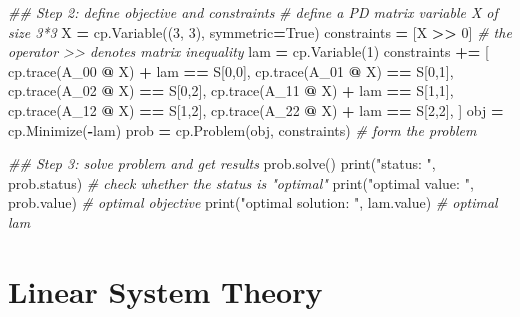 \documentclass[
]{book}
\newenvironment{Shaded}{\begin{snugshade}}{\end{snugshade}}
\newcommand{\BuiltInTok}[1]{#1}
\newcommand{\CommentTok}[1]{\textcolor[rgb]{0.56,0.35,0.01}{\textit{#1}}}
\newcommand{\DecValTok}[1]{\textcolor[rgb]{0.00,0.00,0.81}{#1}}
\newcommand{\NormalTok}[1]{#1}
\newcommand{\OperatorTok}[1]{\textcolor[rgb]{0.81,0.36,0.00}{\textbf{#1}}}
\newcommand{\StringTok}[1]{\textcolor[rgb]{0.31,0.60,0.02}{#1}}
\newcommand{\VariableTok}[1]{\textcolor[rgb]{0.00,0.00,0.00}{#1}}
\theoremstyle{definition}
\theoremstyle{definition}
\theoremstyle{definition}
\theoremstyle{definition}
\theoremstyle{remark}
\begin{document}
\begin{Shaded}
\begin{Highlighting}[]
\CommentTok{\#\# Step 2: define objective and constraints}
\CommentTok{\# define a PD matrix variable X of size 3*3}
\NormalTok{X }\OperatorTok{=}\NormalTok{ cp.Variable((}\DecValTok{3}\NormalTok{, }\DecValTok{3}\NormalTok{), symmetric}\OperatorTok{=}\VariableTok{True}\NormalTok{)}
\NormalTok{constraints }\OperatorTok{=}\NormalTok{ [X }\OperatorTok{\textgreater{}\textgreater{}} \DecValTok{0}\NormalTok{] }\CommentTok{\# the operator \textgreater{}\textgreater{} denotes matrix inequality}
\NormalTok{lam }\OperatorTok{=}\NormalTok{ cp.Variable(}\DecValTok{1}\NormalTok{)}
\NormalTok{constraints }\OperatorTok{+=}\NormalTok{ [}
\NormalTok{    cp.trace(A\_00 }\OperatorTok{@}\NormalTok{ X) }\OperatorTok{+}\NormalTok{ lam }\OperatorTok{==}\NormalTok{ S[}\DecValTok{0}\NormalTok{,}\DecValTok{0}\NormalTok{],}
\NormalTok{    cp.trace(A\_01 }\OperatorTok{@}\NormalTok{ X) }\OperatorTok{==}\NormalTok{ S[}\DecValTok{0}\NormalTok{,}\DecValTok{1}\NormalTok{],}
\NormalTok{    cp.trace(A\_02 }\OperatorTok{@}\NormalTok{ X) }\OperatorTok{==}\NormalTok{ S[}\DecValTok{0}\NormalTok{,}\DecValTok{2}\NormalTok{],}
\NormalTok{    cp.trace(A\_11 }\OperatorTok{@}\NormalTok{ X) }\OperatorTok{+}\NormalTok{ lam }\OperatorTok{==}\NormalTok{ S[}\DecValTok{1}\NormalTok{,}\DecValTok{1}\NormalTok{],}
\NormalTok{    cp.trace(A\_12 }\OperatorTok{@}\NormalTok{ X) }\OperatorTok{==}\NormalTok{ S[}\DecValTok{1}\NormalTok{,}\DecValTok{2}\NormalTok{],}
\NormalTok{    cp.trace(A\_22 }\OperatorTok{@}\NormalTok{ X) }\OperatorTok{+}\NormalTok{ lam }\OperatorTok{==}\NormalTok{ S[}\DecValTok{2}\NormalTok{,}\DecValTok{2}\NormalTok{],}
\NormalTok{]}
\NormalTok{obj }\OperatorTok{=}\NormalTok{ cp.Minimize(}\OperatorTok{{-}}\NormalTok{lam)}
\NormalTok{prob }\OperatorTok{=}\NormalTok{ cp.Problem(obj, constraints) }\CommentTok{\# form the problem}

\CommentTok{\#\# Step 3: solve problem and get results}
\NormalTok{prob.solve()  }
\BuiltInTok{print}\NormalTok{(}\StringTok{"status: "}\NormalTok{, prob.status) }\CommentTok{\# check whether the status is "optimal"}
\BuiltInTok{print}\NormalTok{(}\StringTok{"optimal value: "}\NormalTok{, prob.value) }\CommentTok{\# optimal objective}
\BuiltInTok{print}\NormalTok{(}\StringTok{"optimal solution: "}\NormalTok{, lam.value) }\CommentTok{\# optimal lam}
\end{Highlighting}
\end{Shaded}

\chapter{Linear System Theory}\label{app-lti-system-theory}
\end{document}
